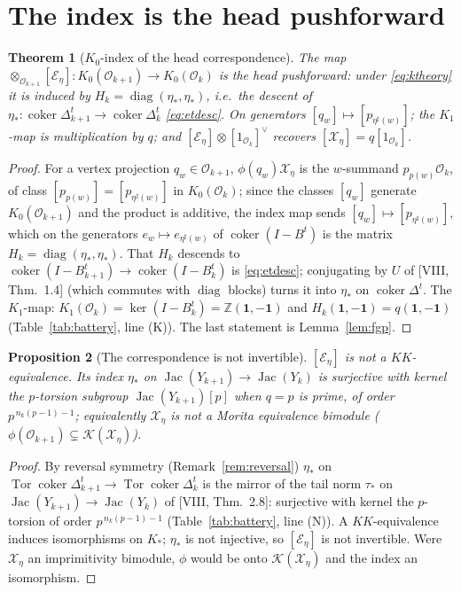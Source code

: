 \documentclass[11pt]{amsart}
\numberwithin{equation}{section}
\newtheorem{theorem}{Theorem}[section]
\newtheorem{proposition}[theorem]{Proposition}
\theoremstyle{definition}
\theoremstyle{remark}
\newcommand{\Z}{\mathbb{Z}}
\newcommand{\cO}{\mathcal{O}}
\newcommand{\cX}{\mathcal{X}}
\newcommand{\cE}{\mathcal{E}}
\newcommand{\cK}{\mathcal{K}}
\newcommand{\KK}{\mathit{KK}}
\newcommand{\Jac}{\operatorname{Jac}}
\newcommand{\coker}{\operatorname{coker}}
\newcommand{\Tor}{\operatorname{Tor}}
\newcommand{\ta}{\tau_*}
\newcommand{\et}{\eta_*}
\begin{document}
\section{The index is the head pushforward}\label{sec:index}

\begin{theorem}[$K_0$-index of the head correspondence]\label{thm:index}
The map $\otimes_{\cO_{k+1}}[\cE_\eta]\colon K_0(\cO_{k+1})\to K_0(\cO_k)$ is the head
pushforward: under \eqref{eq:ktheory} it is induced by $H_k=\operatorname{diag}(\et,\et)$,
i.e.\ the descent of $\et\colon\coker\Delta_{k+1}^{t}\to\coker\Delta_k^{t}$
\eqref{eq:etdesc}. On generators $[q_w]\mapsto[p_{\eta^{\sharp}(w)}]$; the $K_1$-map is
multiplication by $q$; and $[\cE_\eta]\otimes[1_{\cO_k}]^{\vee}$ recovers
$[\cX_\eta]=q[1_{\cO_k}]$.
\end{theorem}

\begin{proof}
For a vertex projection $q_w\in\cO_{k+1}$, $\phi(q_w)\cX_\eta$ is the $w$-summand
$p_{p(w)}\cO_k$, of class $[p_{p(w)}]=[p_{\eta^{\sharp}(w)}]$ in $K_0(\cO_k)$; since the
classes $[q_w]$ generate $K_0(\cO_{k+1})$ and the product is additive, the index map sends
$[q_w]\mapsto[p_{\eta^{\sharp}(w)}]$, which on the generators $e_w\mapsto e_{\eta^{\sharp}(w)}$
of $\coker(I-B^{t})$ is the matrix $H_k=\operatorname{diag}(\et,\et)$. That $H_k$ descends to
$\coker(I-B_{k+1}^{t})\to\coker(I-B_k^{t})$ is \eqref{eq:etdesc}; conjugating by $U$ of
[VIII, Thm.~1.4] (which commutes with $\operatorname{diag}$ blocks) turns it into $\et$ on
$\coker\Delta^{t}$. The $K_1$-map: $K_1(\cO_k)=\ker(I-B_k^{t})=\Z(\mathbf1,-\mathbf1)$ and
$H_k(\mathbf1,-\mathbf1)=q(\mathbf1,-\mathbf1)$ (Table~\ref{tab:battery}, line (K)). The last
statement is Lemma~\ref{lem:fgp}.
\end{proof}

\begin{proposition}[The correspondence is not invertible]\label{prop:notinv}
$[\cE_\eta]$ is not a $\KK$-equivalence. Its index $\et$ on $\Jac(Y_{k+1})\to\Jac(Y_k)$ is
surjective with kernel the $p$-torsion subgroup $\Jac(Y_{k+1})[p]$ when $q=p$ is prime, of
order $p^{\,n_k(p-1)-1}$; equivalently $\cX_\eta$ is not a Morita equivalence bimodule
($\phi(\cO_{k+1})\subsetneq\cK(\cX_\eta)$).
\end{proposition}

\begin{proof}
By reversal symmetry (Remark~\ref{rem:reversal}) $\et$ on $\Tor\coker\Delta_{k+1}^{t}\to
\Tor\coker\Delta_k^{t}$ is the mirror of the tail norm $\ta$ on $\Jac(Y_{k+1})\to\Jac(Y_k)$
of [VIII, Thm.~2.8]: surjective with kernel the $p$-torsion of order $p^{\,n_k(p-1)-1}$
(Table~\ref{tab:battery}, line (N)). A $\KK$-equivalence induces isomorphisms on $K_*$;
$\et$ is not injective, so $[\cE_\eta]$ is not invertible. Were $\cX_\eta$ an
imprimitivity bimodule, $\phi$ would be onto $\cK(\cX_\eta)$ and the index an isomorphism.
\end{proof}
\end{document}
